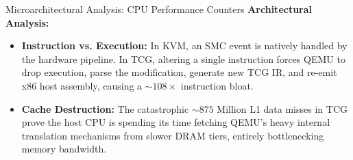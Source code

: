 \documentclass[aspectratio=169]{beamer} %
\begin{document}
\begin{frame}[allowframebreaks]{Microarchitectural Analysis: CPU Performance Counters}
    \textbf{Architectural Analysis:}
    \begin{itemize}
        \item \textbf{Instruction vs. Execution:} In KVM, an SMC event is natively handled by the hardware pipeline. In TCG, altering a single instruction forces QEMU to drop execution, parse the modification, generate new TCG IR, and re-emit x86 host assembly, causing a $\sim 108 \times$ instruction bloat.
        \item \textbf{Cache Destruction:} The catastrophic $\sim 875$ Million L1 data misses in TCG prove the host CPU is spending its time fetching QEMU's heavy internal translation mechanisms from slower DRAM tiers, entirely bottlenecking memory bandwidth.
    \end{itemize}
  \end{frame}
\end{document}

